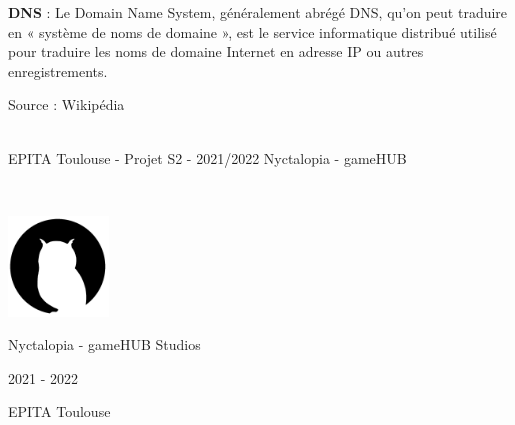 \noindent \textbf{DNS} : Le Domain Name System, généralement abrégé DNS, qu'on peut traduire en « système de noms de domaine », est le service informatique distribué utilisé pour traduire les noms de domaine Internet en adresse IP ou autres enregistrements.

\hfill Source : Wikipédia

\vfill
\noindent\makebox[\linewidth]{\rule{.8\paperwidth}{.6pt}}\\[0.2cm]
EPITA Toulouse - Projet S2 - 2021/2022 \hfill Nyctalopia - gameHUB
\noindent\makebox[\linewidth]{\rule{.8\paperwidth}{.6pt}}

\newpage
\thispagestyle{empty}
~
\vfill
\begin{center}
\includegraphics[width=0.2\textwidth]{img/logo.png}

\large Nyctalopia - gameHUB Studios

\large 2021 - 2022

\large EPITA Toulouse
\end{center}
